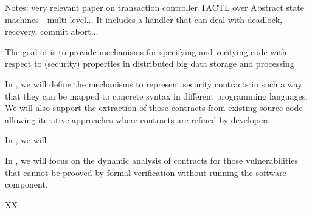 \begin{Workpackage}{\thewpno}
\begin{WPObjectives}
Notes: very relevant paper on transaction controller TACTL over Abstract state machines - multi-level...
It includes a handler that can deal with deadlock, recovery, commit abort... 


\end{WPObjectives}

\begin{WPDescription}

The goal of \theWP{} is to provide mechanisms for specifying and verifying code with respect to
(security) properties in distributed big data storage and processing

\end{WPDescription}



\begin{Task}

\TaskResults{%
}
\TaskHeader{}

In \theTask, we will define the mechanisms to represent security contracts
in such a way that they can be mapped to concrete syntax in different
programming languages. We will also support the extraction of those contracts
from existing source code allowing iterative approaches where contracts
are refined by developers.
\end{Task}

\begin{Task}

\TaskResults{%
}
\TaskHeader{}

In \theTask, we will 
\end{Task}

\begin{Task}

\TaskResults{%
}
\TaskHeader{}

In \theTask, we will focus on the dynamic analysis of contracts for
those vulnerabilities that cannot be prooved by formal verification
without running the software component.
\end{Task}


\begin{WPDeliverables}
  \begin{compactitem}
    \item XX
\end{compactitem}
\end{WPDeliverables}
\end{Workpackage}
